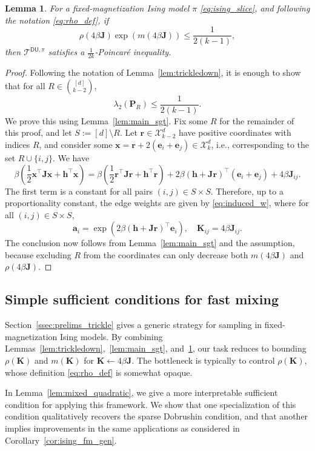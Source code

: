 \documentclass[11pt]{article}
\newtheorem{lemma}{Lemma}
\newcommand{\defeq}{:=}
\newcommand{\lam}{\lambda}
\newcommand{\half}{\frac{1}{2}}
\newcommand{\1}{\mathbf{1}}
\newcommand{\0}{\mathbf{0}}
\newcommand{\Par}[1]{\left(#1\right)}
\newcommand{\mj}{{\mathbf{J}}}
\newcommand{\mk}{{\mathbf{K}}}
\newcommand{\mpp}{{\mathbf{P}}}
\newcommand{\va}{{\mathbf{a}}}
\newcommand{\ve}{{\mathbf{e}}}
\newcommand{\vh}{{\mathbf{h}}}
\newcommand{\vr}{{\mathbf{r}}}
\newcommand{\vx}{{\mathbf{x}}}
\newcommand{\calT}{{\mathcal{T}}}
\newcommand{\calX}{{\mathcal{X}}}
\newcommand{\TDU}[1]{\calT^{\mathsf{DU}, #1}}
\begin{document}
\begin{lemma}\label{lem:ising_trickle}
For a fixed-magnetization Ising model $\pi$ \eqref{eq:ising_slice}, and following the notation \eqref{eq:rho_def}, if 
\[\rho(4\beta\mj)\exp(m(4\beta\mj)) \le \frac 1 {2(k - 1)},\]
then $\TDU{\pi}$ satisfies a $\frac 1 {2k}$-Poincar\'e inequality.
\end{lemma}
\begin{proof}
Following the notation of Lemma~\ref{lem:trickledown}, it is enough to show that for all $R \in \binom{[d]}{k - 2}$,
\[\lam_2\Par{\mpp_R} \le \frac 1 {2(k - 1)}.\]
We prove this using Lemma~\ref{lem:main_sgt}. Fix some $R$ for the remainder of this proof, and let $S \defeq [d] \setminus R$.
Let $\vr \in \calX^d_{k - 2}$ have positive coordinates with indices $R$, and consider some $\vx = \vr + 2(\ve_i + \ve_j) \in \calX^d_k$, i.e., corresponding to the set $R \cup \{i, j\}$. We have
\[\beta\Par{\half \vx^\top \mj \vx + \vh^\top \vx} = \beta\Par{\half \vr^\top \mj \vr + \vh^\top \vr} + 2\beta\Par{\vh+\mj\vr}^\top(\ve_i + \ve_j) + 4\beta\mj_{ij}. \]
The first term is a constant for all pairs $(i, j) \in S \times S$.
Therefore, up to a proportionality constant, the edge weights are given by \eqref{eq:induced_w}, where for all $(i, j) \in S \times S$,
\[\va_i = \exp\Par{2\beta\Par{\vh + \mj \vr}^\top \ve_i},\quad \mk_{ij} = 4\beta \mj_{ij}.\]
The conclusion now follows from Lemma~\ref{lem:main_sgt} and the assumption, because excluding $R$ from the coordinates can only decrease both $m(4\beta\mj)$ and $\rho(4\beta\mj)$.
\end{proof}

\subsection{Simple sufficient conditions for fast mixing}\label{ssec:log_sk}

Section~\ref{ssec:prelims_trickle} gives a generic strategy for sampling in fixed-magnetization Ising models. By combining Lemmas~\ref{lem:trickledown},~\ref{lem:main_sgt}, and~\ref{lem:ising_trickle}, our task reduces to bounding $\rho(\mk)$ and $m(\mk)$ for $\mk \gets 4\beta\mj$. The bottleneck is typically to control $\rho(\mk)$, whose definition \eqref{eq:rho_def} is somewhat opaque. 

In Lemma~\ref{lem:mixed_quadratic}, we give a more interpretable sufficient condition for applying this framework. We show that one specialization of this condition qualitatively recovers the sparse Dobrushin condition, and that another implies improvements in the same applications as considered in Corollary~\ref{cor:ising_fm_gen}.
\end{document}
